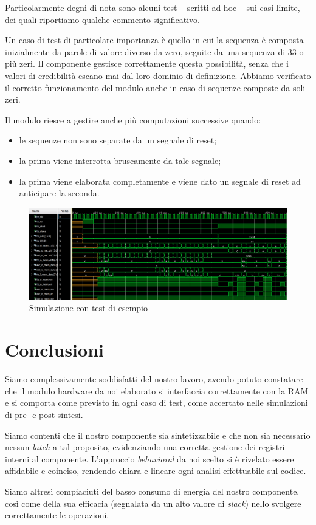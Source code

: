 \documentclass[12pt]{article}
\begin{document}
Particolarmente degni di nota sono alcuni test -- scritti ad hoc -- sui casi limite, dei quali riportiamo qualche commento significativo.

Un caso di test di particolare importanza è quello in cui la sequenza è composta inizialmente da parole di valore diverso da zero, seguite da una sequenza di 33 o più zeri. Il componente gestisce correttamente questa possibilità, senza che i valori di credibilità escano mai dal loro dominio di definizione. Abbiamo verificato il corretto funzionamento del modulo anche in caso di sequenze composte da soli zeri.

Il modulo riesce a gestire anche più computazioni successive quando:
\begin{itemize}
    \item le sequenze non sono separate da un segnale di reset;
    \item la prima viene interrotta bruscamente da tale segnale;
    \item la prima viene elaborata completamente e viene dato un segnale di reset ad anticipare la seconda.
\end{itemize}

\begin{figure}
    \centering
    \includegraphics[width=\textwidth]{test_example.png}
    \caption{Simulazione con test di esempio}\label{fig:test_example}
\end{figure}

\section{Conclusioni}

Siamo complessivamente soddisfatti del nostro lavoro, avendo potuto constatare che il modulo hardware da noi elaborato si interfaccia correttamente con la RAM e si comporta come previsto in ogni caso di test, come accertato nelle simulazioni di pre- e post-sintesi.

Siamo contenti che il nostro componente sia sintetizzabile e che non sia necessario nessun \textit{latch} a tal proposito, evidenziando una corretta gestione dei registri interni al componente. L'approccio \textit{behavioral} da noi scelto si è rivelato essere affidabile e coinciso, rendendo chiara e lineare ogni analisi effettuabile sul codice.

Siamo altresì compiaciuti del basso consumo di energia del nostro componente, così come della sua efficacia (segnalata da un alto valore di \textit{slack}) nello svolgere correttamente le operazioni.
\end{document}
